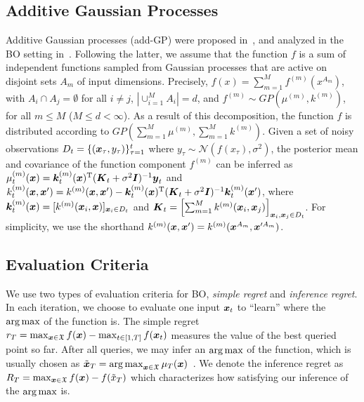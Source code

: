 \subsection{Additive Gaussian Processes}
\label{ssec:addgp}
Additive Gaussian processes (add-GP) were proposed in~\cite{duvenaud2011additive}, and analyzed in the BO setting in~\cite{kandasamy2015high}.  Following the latter, %
we assume that the function $f$ is a sum of independent functions sampled from Gaussian processes that are active on disjoint sets $A_m$ of input dimensions. Precisely,
%
$f(x) = \sum_{m=1}^M f^{(m)}(x^{A_m})$,
with $A_{i} \cap A_{j} = \emptyset$ for all $i\neq j$, $|\cup_{i=1}^M A_i|=d$, and $f^{(m)}\sim GP(\mu^{(m)}, k^{(m)})$, for all $m \leq M$ ($M \leq d < \infty$). %
As a result of this decomposition, the function $f$ is distributed according to $GP(\sum_{m=1}^M\mu^{(m)}, \sum_{m=1}^M k^{(m)})$. Given a set of noisy observations $D_t=\{({\boldsymbol{x}}_\tau,y_\tau)\}_{\tau=1}^{t}$ where $y_\tau \sim \mathcal N(f(x_\tau), \sigma^2)$, the posterior mean and covariance of the function component $f^{(m)}$ can be inferred as 
$\mu_{t}^{(m)}({\boldsymbol{x}})= \boldsymbol{k}^{(m)}_t({\boldsymbol{x}})^{\textrm T}(\boldsymbol{K}_t+\sigma^2\boldsymbol{I})^{-1}\boldsymbol{y}_t$ and 
$k_{t}^{(m)}({\boldsymbol{x}},{\boldsymbol{x}}') = k^{(m)}({\boldsymbol{x}},{\boldsymbol{x}}') - \boldsymbol{k}^{(m)}_t({\boldsymbol{x}})^{\textrm T}(\boldsymbol{K}_t+\sigma^2\boldsymbol{I})^{-1} \boldsymbol{k}^{(m)}_t({\boldsymbol{x}}')$, where $\boldsymbol{k}^{(m)}_t({\boldsymbol{x}}) = [k^{(m)}({\boldsymbol{x}}_i,{\boldsymbol{x}})]_{{\boldsymbol{x}}_i\in D_t}$ and  $\boldsymbol{K}_t =\left[ \sum_{m=1}^M k^{(m)}({\boldsymbol{x}}_i,{\boldsymbol{x}}_j)\right]_{{\boldsymbol{x}}_i,{\boldsymbol{x}}_j\in D_t}$. For simplicity, we use the shorthand $k^{(m)}({\boldsymbol{x}},{\boldsymbol{x}}') = k^{(m)}({\boldsymbol{x}}^{A_m}, {\boldsymbol{x}}'^{A_m})$.
%

\subsection{Evaluation Criteria}
\label{ssec:eval}
%
We use two types of evaluation criteria for BO, \emph{simple regret} and \emph{inference regret}. In each iteration, we choose to evaluate one input ${\boldsymbol{x}}_t$ to ``learn'' where the $\operatorname{arg\,max}$ of the function is. %
The simple regret $r_T = \max_{{\boldsymbol{x}}\in\mathfrak X} f({\boldsymbol{x}}) - \max_{t\in[1,T]} f({\boldsymbol{x}}_t)$ measures the value of the best queried point so far. %
%
%
After all queries, we may infer an $\operatorname{arg\,max}$ of the function, which is usually chosen as $\tilde {{\boldsymbol{x}}}_T = \operatorname{arg\,max}_{{\boldsymbol{x}}\in\mathfrak X} \mu_{T}({\boldsymbol{x}})$~\cite{hennig2012,hernandez2014predictive}. We denote the inference regret as $R_T = \max_{{\boldsymbol{x}}\in\mathfrak X} f({\boldsymbol{x}}) - f(\tilde x_T)$ which characterizes how satisfying our inference of the $\operatorname{arg\,max}$ is. %

